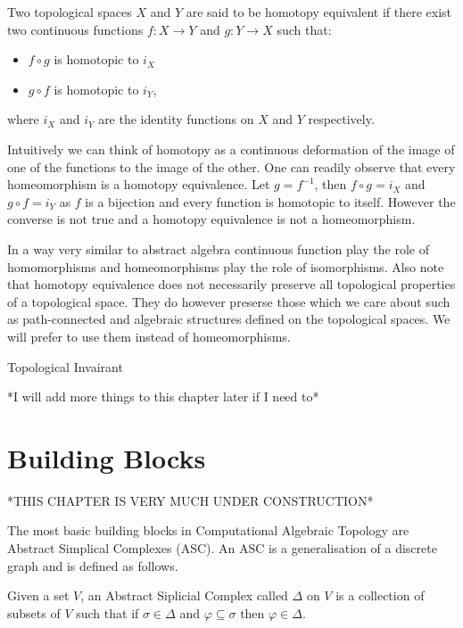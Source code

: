 \begin{defn} Two topological spaces $X$ and $Y$ are said to be homotopy equivalent if there exist two continuous functions $f: X \to Y$ and $g: Y \to X$ such that:  \end{defn}
\begin{itemize}
    \item $f \circ g$ is homotopic to $i_X$ 
    \item $g \circ f$ is homotopic to $i_Y$,
\end{itemize}

where $i_X$ and $i_Y$ are the identity functions on $X$ and $Y$ respectively.

Intuitively we can think of homotopy as a continuous deformation of the image of one of the functions to the image of the other. One can readily observe that every homeomorphism is a homotopy equivalence. Let $g = f^{-1}$, then $f \circ g = i_X$ and $g \circ f = i_Y$ as $f$ is a bijection and every function is homotopic to itself. However the converse is not true and a homotopy equivalence is not a homeomorphism.

In a way very similar to abstract algebra continuous function play the role of homomorphisms and homeomorphisms play the role of isomorphisms. Also note that homotopy equivalence does not necessarily preserve all topological properties of a topological space. They do however preserse those which we care about such as path-connected and algebraic structures defined on the topological spaces. We will prefer to use them instead of homeomorphisms. 


\begin{defn}{Topological Invairant}   \end{defn}

*I will add more things to this chapter later if I need to*


\section{Building Blocks}

*THIS CHAPTER IS VERY MUCH UNDER CONSTRUCTION*

The most basic building blocks in Computational Algebraic Topology are Abstract Simplical Complexes (ASC). An ASC is a generalisation of a discrete graph and is defined as follows.


\begin{defn} Given a set $V$, an Abstract Siplicial Complex called $\Delta$ on $V$ is a collection of subsets of $V$ such that if $\sigma \in \Delta$ and $\varphi \subseteq \sigma$ then $\varphi \in \Delta$.  \end{defn}


